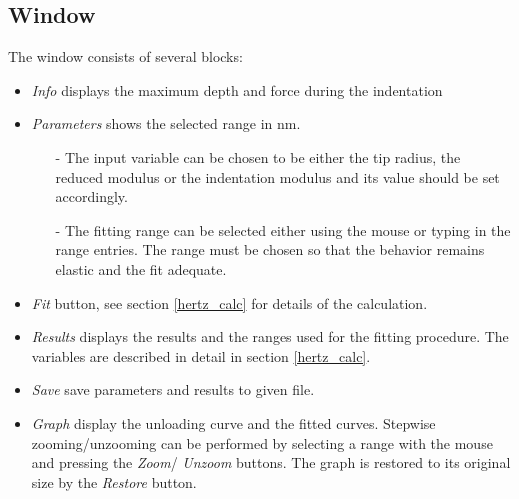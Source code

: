 \subsection{Window}
The window consists of several blocks:
\begin{itemize}
 \item \emph{Info} displays the maximum depth and force during the indentation
 \item \emph{Parameters} shows the selected range in nm. 
        \begin{itemize}
           \item[-] The input variable can be chosen to be either the tip radius, the reduced modulus or the indentation modulus and its value should be set accordingly.
           \item[-] The fitting range can be selected either using the mouse or typing in the range entries. The range must be chosen so that the behavior remains elastic and the fit adequate.
        \end{itemize}
 \item \emph{Fit} button, see section \ref{hertz_calc} for details of the calculation.
 \item \emph{Results} displays the results and the ranges used for the fitting procedure. 
       The variables are described in detail in section \ref{hertz_calc}.
 \item \emph{Save} save parameters and results to given file. 
 \item \emph{Graph} display the unloading curve and the fitted curves.  Stepwise zooming/unzooming can be performed by selecting a range with the mouse and pressing the \emph{Zoom}/ \emph{Unzoom} buttons. The graph is restored to its original size by the \emph{Restore} button.
\end{itemize}

